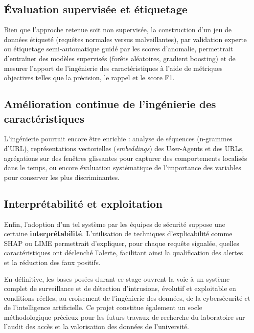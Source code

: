 \documentclass[a4paper,12pt]{article}
\begin{document}
\subsection*{Évaluation supervisée et étiquetage}

Bien que l'approche retenue soit non supervisée, la construction d'un jeu de données étiqueté (requêtes normales versus malveillantes), par validation experte ou étiquetage semi-automatique guidé par les scores d'anomalie, permettrait d'entraîner des modèles supervisés (forêts aléatoires, gradient boosting) et de mesurer l'apport de l'ingénierie des caractéristiques à l'aide de métriques objectives telles que la précision, le rappel et le score F1.

\subsection*{Amélioration continue de l'ingénierie des caractéristiques}

L'ingénierie pourrait encore être enrichie : analyse de séquences (n-grammes d'URL), représentations vectorielles (\emph{embeddings}) des User-Agents et des URLs, agrégations sur des fenêtres glissantes pour capturer des comportements localisés dans le temps, ou encore évaluation systématique de l'importance des variables pour conserver les plus discriminantes.

\subsection*{Interprétabilité et exploitation}

Enfin, l'adoption d'un tel système par les équipes de sécurité suppose une certaine \textbf{interprétabilité}. L'utilisation de techniques d'explicabilité comme SHAP ou LIME permettrait d'expliquer, pour chaque requête signalée, quelles caractéristiques ont déclenché l'alerte, facilitant ainsi la qualification des alertes et la réduction des faux positifs.

En définitive, les bases posées durant ce stage ouvrent la voie à un système complet de surveillance et de détection d'intrusions, évolutif et exploitable en conditions réelles, au croisement de l'ingénierie des données, de la cybersécurité et de l'intelligence artificielle. Ce projet constitue également un socle méthodologique précieux pour les futurs travaux de recherche du laboratoire sur l'audit des accès et la valorisation des données de l'université.
\end{document}
